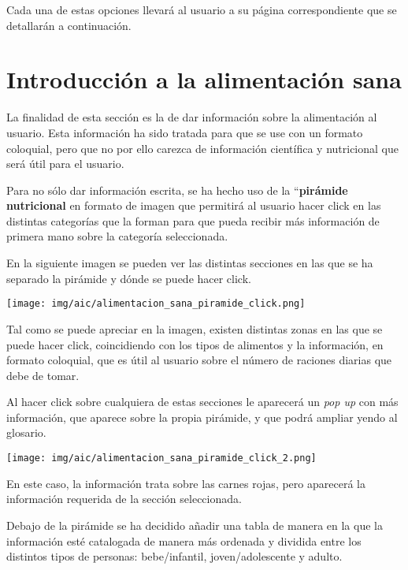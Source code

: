 \documentclass{\ClassPath/viu-tfm-template}
\begin{document}
Cada una de estas opciones llevará al usuario a su página correspondiente que se detallarán a continuación.


\section{Introducción a la alimentación sana}
La finalidad de esta sección es la de dar información sobre la alimentación al usuario. Esta información ha sido tratada para que se use con un formato coloquial, pero que no por ello carezca de información científica y nutricional que será útil para el usuario.

Para no sólo dar información escrita, se ha hecho uso de la “\textbf{pirámide nutricional} en formato de imagen que permitirá al usuario hacer click en las distintas categorías que la forman para que pueda recibir más información de primera mano sobre la categoría seleccionada.

En la siguiente imagen se pueden ver las distintas secciones en las que se ha separado la pirámide y dónde se puede hacer click.
\begin{center}
    \vspace{-10pt}
    \texttt{[image: img/aic/alimentacion\_sana\_piramide\_click.png]}
    \vspace{-20pt}
\end{center}

Tal como se puede apreciar en la imagen, existen distintas zonas en las que se puede hacer click, coincidiendo con los tipos de alimentos y la información, en formato coloquial, que es útil al usuario sobre el número de raciones diarias que debe de tomar.

Al hacer click sobre cualquiera de estas secciones le aparecerá un \textit{pop up} con más información, que aparece sobre la propia pirámide, y que podrá ampliar yendo al glosario.

\begin{center}
    \vspace{-10pt}
    \texttt{[image: img/aic/alimentacion\_sana\_piramide\_click\_2.png]}
    \vspace{-20pt}
\end{center}

En este caso, la información trata sobre las carnes rojas, pero aparecerá la información requerida de la sección seleccionada.

Debajo de la pirámide se ha decidido añadir una tabla de manera en la que la información esté catalogada de manera más ordenada y dividida entre los distintos tipos de personas: bebe/infantil, joven/adolescente y adulto.
\end{document}

